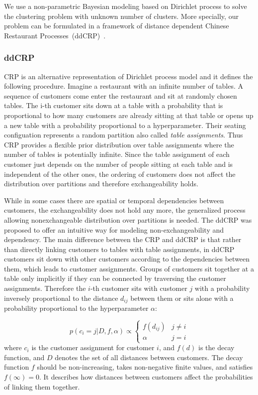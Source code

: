 We use a non-parametric Bayesian modeling based on Dirichlet process to solve the clustering problem with unknown number of clusters. More specially, our problem can be formulated in a framework of distance dependent Chinese Restaurant Processes~(ddCRP)~\cite{ddCRPBlei}\cite{walon13cvpr}. 


\subsubsection{ddCRP}
 
CRP is an alternative representation of Dirichlet process model and it defines the following procedure. Imagine a restaurant with an infinite number of tables. A sequence of customers come enter the restaurant and sit at randomly chosen tables. The i-th customer sits down at a table with a probability that is proportional to how many customers are already sitting at that table or opens up a new table with a probability proportional to a hyperparameter. Their seating configuation represents a random partition also called \emph{table assignments}. Thus CRP provides a ﬂexible prior distribution over table assignments where the number of tables is potentially infinite. 
Since the table assignment of each customer just depends on the number of people sitting at each table and is independent of the other ones, the ordering of customers does not affect the distribution over partitions and therefore exchangeability holds. 


While in some cases there are spatial or temporal dependencies between customers, the exchangeability does not hold any more, the generalized process allowing nonexchangeable distribution over partitions is needed. The ddCRP was proposed to offer an intuitive way for modeling non-exchangeability and dependency. The main difference between the CRP and ddCRP is that rather than directly linking customers to tables with table assignments, in ddCRP customers sit down with other customers according to the dependencies between them, which leads to customer assignments. Groups of customers sit together at a table only implicitly if they can be connected by traversing the customer assignments. Therefore the $i$-th customer sits with customer $j$ with a probability inversely proportional to the distance $d_{ij}$ between them or sits alone with a probability proportional to the hyperparameter $\alpha$:

\begin{equation}
p(c_i=j|D,f,\alpha) \propto \left \{ 
\begin{array}{ll}
f(d_{ij}) & j \neq i \\
\alpha    & j = i   
\end{array}
\right.
\label{eq:ddCRP}
\end{equation}
%
where $c_i$ is the customer assignment for customer $i$, and $f(d)$ is the decay function, and $D$ denotes the set of all distances between customers. 
The decay function $f$ should be non-increasing, takes non-negative finite values, and satisfies $f(\infty) = 0$. 
It describes how distances between customers affect the probabilities of linking them together.

